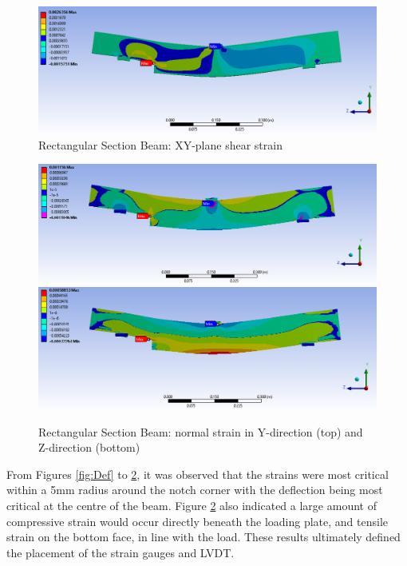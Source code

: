 \documentclass[11pt,a4paper]{article}
\numberwithin{equation}{subsection}
\begin{document}
\begin{figure}[h]
	\begin{center}
		\includegraphics[scale=0.45]{YZ_shear_strain}
	\end{center}
	\caption{Rectangular Section Beam: XY-plane shear strain}
	\label{fig:yz_shear}
\end{figure}
\pagebreak
\begin{figure}[h]
	\begin{center}
		\includegraphics[scale=0.45]{y_normal_strain}
		\includegraphics[scale=0.45]{z_normal_strain}
	\end{center}
	\caption{Rectangular Section Beam: normal strain in Y-direction (top) and Z-direction (bottom)}
	\label{fig:fig:y_norm}
\end{figure}

\noindent
From Figures \ref{fig:Def} to \ref{fig:fig:y_norm}, it was observed that the strains were most critical within a 5mm radius around the notch corner with the deflection being most critical at the centre of the beam. Figure \ref{fig:fig:y_norm} also indicated a large amount of compressive strain would occur directly beneath the loading plate, and tensile strain on the bottom face, in line with the load. These results ultimately defined the placement of the strain gauges and LVDT.
\end{document}
